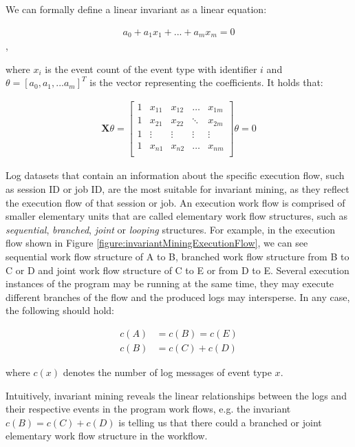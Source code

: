 We can formally define a linear invariant as a linear equation: 

\begin{gather}
    a_0 + a_1 x_1 + ... + a_m x_m = 0
\end{gather},

where $x_i$ is the event count of the event type with identifier $i$ and $\theta = [a_0, a_1, ... a_m]^T$ is the vector representing the coefficients. It holds that: 

\begin{gather}
\mathbf{X} \theta = 
\begin{bmatrix}
1 & x_{11} & x_{12} & \hdots & x_{1m}\\
1 & x_{21} & x_{22} & \ddots & x_{2m}\\
1 & \vdots & \vdots & \vdots &\vdots \\
1 & x_{n1} & x_{n2} & \hdots & x_{nm}\\
\end{bmatrix}
\theta = 0
\end{gather}

Log datasets that contain an information about the specific execution flow, such as session ID or job ID, are the most suitable for invariant mining, as they reflect the execution flow of that session or job. An execution work flow is comprised of smaller elementary units that are called elementary work flow structures, such as \textit{sequential}, \textit{branched}, \textit{joint} or \textit{looping} structures. For example, in the execution flow shown in Figure \ref{figure:invariantMiningExecutionFlow}, we can see sequential work flow structure of A to B, branched work flow structure from B to C or D and joint work flow structure of C to E or from D to E. Several execution instances of the program may be running at the same time, they may execute different branches of the flow and the produced logs may intersperse. In any case, the following should hold:

\begin{align}
    c(A) &= c(B) = c(E) \\
    c(B) &= c(C) + c(D)
\end{align}

where $c(x)$ denotes the number of log messages of event type $x$. 

Intuitively, invariant mining reveals the linear relationships between the logs and their respective events in the program work flows, e.g. the invariant $c(B) = c(C) + c(D)$ is telling us that there could a branched or joint elementary work flow structure in the workflow. 

